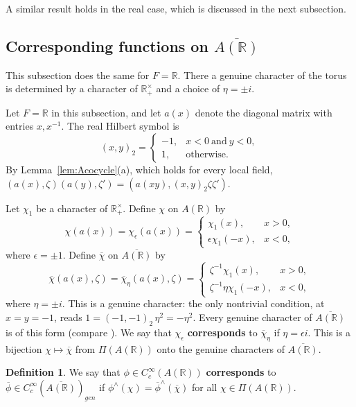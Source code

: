 \documentclass[12pt,letterpaper]{book}
\theoremstyle{plain}
\theoremstyle{definition}
\newtheorem{definition}[theorem]{Definition}
\theoremstyle{remark}
\theoremstyle{remark}
\begin{document}
A similar result holds in the real case, which is discussed in the
next subsection.

\subsection{Corresponding functions on \texorpdfstring{$\overline{A({\mathbb{R}})}$}{A(R)-bar}}\label{sec:realA}

This subsection does the same for $F={\mathbb R}$. There a genuine character of the torus is determined by a character of ${\mathbb R}_+^\times$ and a choice of $\eta=\pm i$.


Let $F={\mathbb{R}}$ in this subsection, and let $a(x)$ denote the
diagonal matrix with entries $x,x^{-1}$. The real Hilbert symbol is
\[
(x,y)_2=
\left\{
\begin{array}{ll}
-1, & x<0\ \text{and}\ y<0,\\
1, & \text{otherwise}.
\end{array}
\right.
\]
By
Lemma~\ref{lem:Acocycle}(a), which holds for every local field,
$(a(x),\zeta)(a(y),\zeta')=(a(xy),(x,y)_2\zeta\zeta')$.

Let $\chi_1$ be a character of ${\mathbb{R}}_+^\times$. Define
$\chi$ on $A({\mathbb{R}})$ by
\[
\chi(a(x))=\chi_\epsilon(a(x))
=
\left\{
\begin{array}{ll}
\chi_1(x), & x>0,\\
\epsilon \chi_1(-x), & x<0,
\end{array}
\right.
\]
where $\epsilon =\pm 1$. Define
$\overline{\chi}$ on $\overline{A({\mathbb{R}})}$ by
\[
\overline{\chi}(a(x),\zeta)=\overline{\chi}_\eta(a(x),\zeta)
=
\left\{
\begin{array}{ll}
\zeta^{-1}\chi_1(x), & x>0,\\
\zeta^{-1}\eta \chi_1(-x), & x<0,
\end{array}
\right.
\]
where $\eta=\pm i$. This is a genuine character: the only nontrivial
condition, at $x=y=-1$, reads $1=(-1,-1)_2\,\eta^2=-\eta^2$. Every
genuine character of $\overline{A({\mathbb R})}$ is of this form (compare
\cite{GS}). We say that
$\chi_\epsilon$ {\bf corresponds} to $\overline{\chi}_\eta$ if
$\eta =\epsilon i$. This is a bijection
$\chi\mapsto\overline{\chi}$ from $\Pi(A({\mathbb R}))$ onto the genuine
characters of $\overline{A({\mathbb R})}$.

\begin{definition}\label{def:corrA-real}
We say that $\phi \in C_c^\infty(A({\mathbb R}))$ {\bf corresponds} to
$\overline{\phi}\in C_c^\infty(\overline{A({\mathbb R})})_{gen}$
if
$\phi^{\wedge}(\chi)=
\overline{\phi}^{\wedge}(\overline{\chi})$
for all $\chi \in \Pi(A({\mathbb R}))$.
\end{definition}
\end{document}
